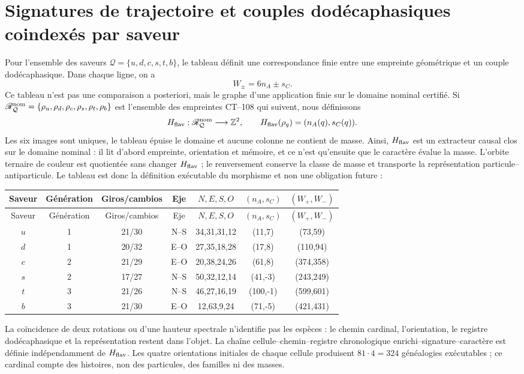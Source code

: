 \section{Signatures de trajectoire et couples dodécaphasiques coindexés par saveur}

Pour l'ensemble des saveurs
\(\mathcal Q=\{u,d,c,s,t,b\}\), le tableau définit une correspondance finie
entre une empreinte géométrique et un couple dodécaphasique. Dans chaque ligne, on a
\[
 W_\pm=6n_A\pm s_C.
\]
Ce tableau n'est pas une comparaison a posteriori, mais le graphe d'une application
finie sur le domaine nominal certifié. Si
\(\mathscr R_{\mathcal Q}^{\rm nom}=\{\rho_u,\rho_d,\rho_c,\rho_s,\rho_t,\rho_b\}\)
est l'ensemble des empreintes CT--108 qui suivent, nous définissons
\[
 H_{\rm flav}:\mathscr R_{\mathcal Q}^{\rm nom}\longrightarrow\mathbb Z^2,
 \qquad H_{\rm flav}(\rho_q)=(n_A(q),s_C(q)).
\]
Les six images sont uniques, le tableau épuise le domaine et aucune colonne
ne contient de masse. Ainsi, \(H_{\rm flav}\) est un extracteur causal clos sur
le domaine nominal : il lit d'abord empreinte, orientation et mémoire, et ce n'est qu'ensuite que
le caractère évalue la masse. L'orbite ternaire de couleur est quotientée sans changer
\(H_{\rm flav}\) ; le renversement conserve la classe de masse et transporte la
représentation particule--antiparticule. Le tableau est donc la définition
exécutable du morphisme et non une obligation future :

\begin{longtable}{c c c c c c c}
\toprule
Saveur & Génération & Giros/cambios & Eje & \(N,E,S,O\)
& \((n_A,s_C)\) & \((W_+,W_-)\)\\
\midrule
\endfirsthead
\toprule
Saveur & Génération & Giros/cambios & Eje & \(N,E,S,O\)
& \((n_A,s_C)\) & \((W_+,W_-)\)\\
\midrule
\endhead
\(u\)&1&21/30&N--S&34,31,31,12&(11,7)&(73,59)\\
\(d\)&1&20/32&E--O&27,35,18,28&(17,8)&(110,94)\\
\(c\)&2&21/29&E--O&20,38,24,26&(61,8)&(374,358)\\
\(s\)&2&17/27&N--S&50,32,12,14&(41,-3)&(243,249)\\
\(t\)&3&21/26&N--S&46,27,16,19&(100,-1)&(599,601)\\
\(b\)&3&21/30&E--O&12,63,9,24&(71,-5)&(421,431)\\
\bottomrule
\end{longtable}

La coïncidence de deux rotations ou d'une hauteur spectrale n'identifie pas les
espèces : le chemin cardinal, l'orientation, le registre dodécaphasique et la
représentation restent dans l'objet. La chaîne
cellule--chemin--registre chronologique enrichi--signature--caractère est définie
indépendamment de \(H_{\rm flav}\). Les
quatre orientations initiales de chaque cellule produisent
\(81\cdot4=324\) généalogies exécutables ; ce cardinal compte des histoires, non des
particules, des familles ni des masses.
